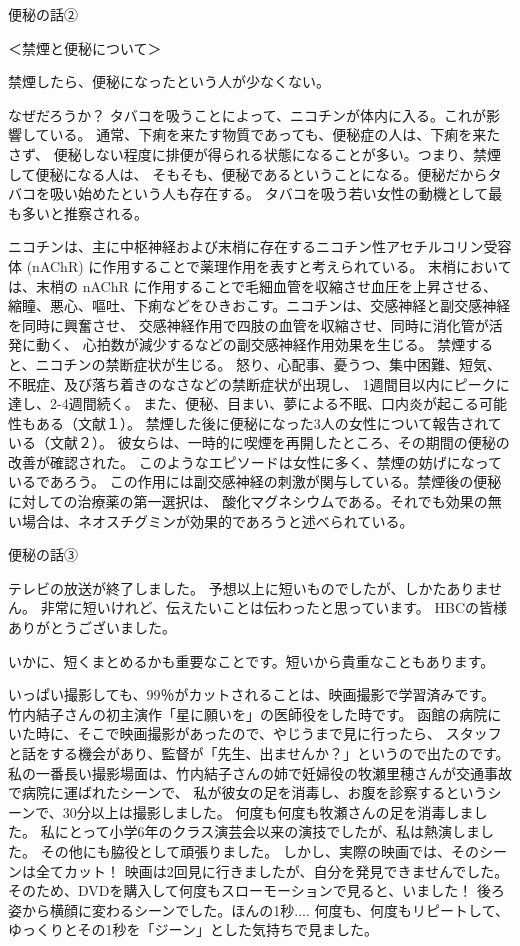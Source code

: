 便秘の話②

＜禁煙と便秘について＞

禁煙したら、便秘になったという人が少なくない。 

なぜだろうか？ 
タバコを吸うことによって、ニコチンが体内に入る。これが影響している。 
通常、下痢を来たす物質であっても、便秘症の人は、下痢を来たさず、
便秘しない程度に排便が得られる状態になることが多い。つまり、禁煙して便秘になる人は、
そもそも、便秘であるということになる。便秘だからタバコを吸い始めたという人も存在する。
タバコを吸う若い女性の動機として最も多いと推察される。 

ニコチンは、主に中枢神経および末梢に存在するニコチン性アセチルコリン受容体 (nAChR) 
に作用することで薬理作用を表すと考えられている。 
末梢においては、末梢の nAChR に作用することで毛細血管を収縮させ血圧を上昇させる、
縮瞳、悪心、嘔吐、下痢などをひきおこす。ニコチンは、交感神経と副交感神経を同時に興奮させ、
交感神経作用で四肢の血管を収縮させ、同時に消化管が活発に動く、
心拍数が減少するなどの副交感神経作用効果を生じる。 
禁煙すると、ニコチンの禁断症状が生じる。
怒り、心配事、憂うつ、集中困難、短気、不眠症、及び落ち着きのなさなどの禁断症状が出現し、
1週間目以内にピークに達し、2-4週間続く。
また、便秘、目まい、夢による不眠、口内炎が起こる可能性もある（文献１）。 
禁煙した後に便秘になった3人の女性について報告されている（文献２）。
彼女らは、一時的に喫煙を再開したところ、その期間の便秘の改善が確認された。
このようなエピソードは女性に多く、禁煙の妨げになっているであろう。
この作用には副交感神経の刺激が関与している。禁煙後の便秘に対しての治療薬の第一選択は、
酸化マグネシウムである。それでも効果の無い場合は、ネオスチグミンが効果的であろうと述べられている。

便秘の話③

テレビの放送が終了しました。 
予想以上に短いものでしたが、しかたありません。 
非常に短いけれど、伝えたいことは伝わったと思っています。 
HBCの皆様ありがとうございました。 

いかに、短くまとめるかも重要なことです。短いから貴重なこともあります。 

いっぱい撮影しても、99％がカットされることは、映画撮影で学習済みです。 
竹内結子さんの初主演作「星に願いを」の医師役をした時です。 
函館の病院にいた時に、そこで映画撮影があったので、やじうまで見に行ったら、
スタッフと話をする機会があり、監督が「先生、出ませんか？」というので出たのです。
私の一番長い撮影場面は、竹内結子さんの姉で妊婦役の牧瀬里穂さんが交通事故で病院に運ばれたシーンで、
私が彼女の足を消毒し、お腹を診察するというシーンで、30分以上は撮影しました。
何度も何度も牧瀬さんの足を消毒しました。
私にとって小学6年のクラス演芸会以来の演技でしたが、私は熱演しました。
その他にも脇役として頑張りました。 
しかし、実際の映画では、そのシーンは全てカット！ 
映画は2回見に行きましたが、自分を発見できませんでした。
そのため、DVDを購入して何度もスローモーションで見ると、いました！ 
後ろ姿から横顔に変わるシーンでした。ほんの1秒.... 
何度も、何度もリピートして、ゆっくりとその1秒を「ジーン」とした気持ちで見ました。 

